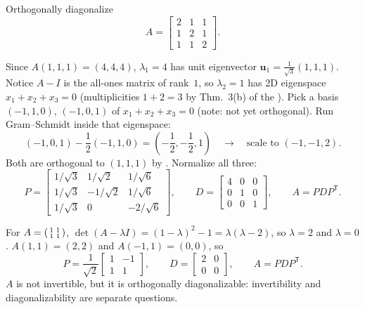\documentclass[10pt]{scrartcl}
\newcommand{\vv}[1]{\mathbf{#1}}
\begin{document}
\begin{example*}
  Orthogonally diagonalize
  \[
    A=\begin{bmatrix}2&1&1\\1&2&1\\1&1&2\end{bmatrix}.
  \]
  \begin{steps}
    \ii Since $A(1,1,1)=(4,4,4)$, $\lambda_1=4$ has unit eigenvector $\vv u_1=\frac{1}{\sqrt{3}}(1,1,1)$. Notice $A-I$ is the all-ones matrix of rank~$1$, so $\lambda_2=1$ has 2D eigenspace $x_1+x_2+x_3=0$ (multiplicities $1+2=3$ by Thm.~3(b) of the ).
    \ii Pick a basis $(-1,1,0)$, $(-1,0,1)$ of $x_1+x_2+x_3=0$ (note: not yet orthogonal). Run Gram--Schmidt inside that eigenspace:
    \[
      (-1,0,1) - \frac{1}{2}(-1,1,0) = \left(-\frac12,-\frac12,1\right) \quad\longrightarrow\quad \text{scale to } (-1,-1,2).
    \]
    \ii Both are orthogonal to $(1,1,1)$ by . Normalize all three:
    \[
      P=\begin{bmatrix}1/\sqrt{3} & 1/\sqrt{2} & 1/\sqrt{6}\\ 1/\sqrt{3} & -1/\sqrt{2} & 1/\sqrt{6}\\ 1/\sqrt{3} & 0 & -2/\sqrt{6}\end{bmatrix},\qquad
      D=\begin{bmatrix}4&0&0\\0&1&0\\0&0&1\end{bmatrix},\qquad A=PDP^{\mathsf T}.
    \]
  \end{steps}
\end{example*}

\begin{example*}
  For $A=\begin{psmallmatrix}1&1\\1&1\end{psmallmatrix}$, $\det(A-\lambda I)=(1-\lambda)^2-1=\lambda(\lambda-2)$, so $\lambda=2$ and $\lambda=0$. $A(1,1)=(2,2)$ and $A(-1,1)=(0,0)$, so
  \[
    P=\frac{1}{\sqrt2}\begin{bmatrix}1&-1\\1&1\end{bmatrix},\qquad D=\begin{bmatrix}2&0\\0&0\end{bmatrix},\qquad A=PDP^{\mathsf T}.
  \]
  $A$ is not invertible, but it is orthogonally diagonalizable: invertibility and diagonalizability are separate questions.
\end{example*}
\end{document}
